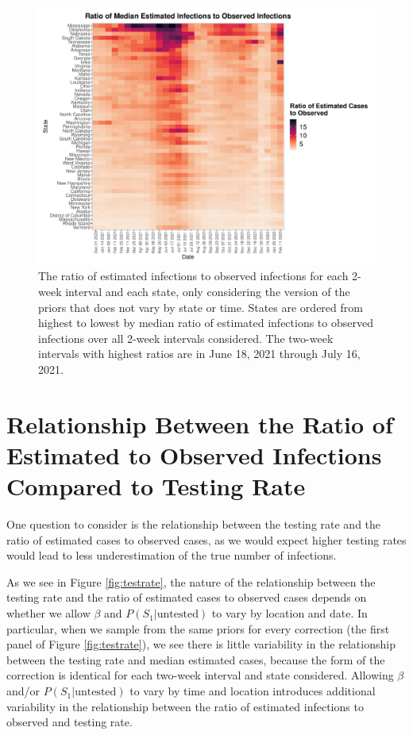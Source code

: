 \documentclass[12pt,twoside]{smiththesis}
\begin{document}
\begin{figure}
\includegraphics[width=1\linewidth]{figure/heatmap_ratio_est_observed} \caption{\label{fig:ratio-est-observed} The ratio of estimated infections to observed infections for each 2-week interval and each state, only considering the version of the priors that does not vary by state or time. States are ordered from highest to lowest by median ratio of estimated infections to observed infections over all 2-week intervals considered. The two-week intervals with highest ratios are in June 18, 2021 through July 16, 2021.}\label{fig:unnamed-chunk-11}
\end{figure}
\hypertarget{relationship-between-the-ratio-of-estimated-to-observed-infections-compared-to-testing-rate}{%
\section{Relationship Between the Ratio of Estimated to Observed Infections Compared to Testing Rate}\label{relationship-between-the-ratio-of-estimated-to-observed-infections-compared-to-testing-rate}}

One question to consider is the relationship between the testing rate and the ratio of estimated cases to observed cases, as we would expect higher testing rates would lead to less underestimation of the true number of infections.

As we see in Figure \ref{fig:testrate}, the nature of the relationship between the testing rate and the ratio of estimated cases to observed cases depends on whether we allow \(\beta\) and \(P(S_1|\text{untested})\) to vary by location and date. In particular, when we sample from the same priors for every correction (the first panel of Figure \ref{fig:testrate}), we see there is little variability in the relationship between the testing rate and median estimated cases, because the form of the correction is identical for each two-week interval and state considered. Allowing \(\beta\) and/or \(P(S_1|\text{untested})\) to vary by time and location introduces additional variability in the relationship between the ratio of estimated infections to observed and testing rate.
\end{document}
